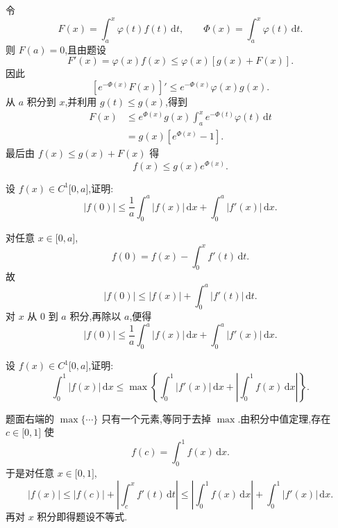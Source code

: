 \begin{solution}
    令
    \[
        F(x)=\int_a^x\varphi(t)f(t)\,\mathrm{d}t,
        \qquad
        \Phi(x)=\int_a^x\varphi(t)\,\mathrm{d}t.
    \]
    则 $F(a)=0$,且由题设
    \[
        F'(x)=\varphi(x)f(x)
        \leq\varphi(x)[g(x)+F(x)].
    \]
    因此
    \[
        [e^{-\Phi(x)}F(x)]'
        \leq e^{-\Phi(x)}\varphi(x)g(x).
    \]
    从 $a$ 积分到 $x$,并利用 $g(t)\leq g(x)$,得到
    \[
        \begin{aligned}
            F(x)
             & \leq e^{\Phi(x)}g(x)
            \int_a^xe^{-\Phi(t)}\varphi(t)\,\mathrm{d}t \\
             & =g(x)[e^{\Phi(x)}-1].
        \end{aligned}
    \]
    最后由 $f(x)\leq g(x)+F(x)$ 得
    \[
        f(x)\leq g(x)e^{\Phi(x)}.
    \]
\end{solution}

\begin{example}
    设 $f(x)\in C^1\lbrack 0,a\rbrack$,证明:
    \[
        |f(0)|\leq\dfrac{1}{a}\int_0^a|f(x)|\,\mathrm{d}x
        +\int_0^a|f'(x)|\,\mathrm{d}x.
    \]
\end{example}
\exampleblank

\begin{solution}
    对任意 $x\in\lbrack0,a\rbrack$,
    \[
        f(0)=f(x)-\int_0^xf'(t)\,\mathrm{d}t.
    \]
    故
    \[
        |f(0)|\leq|f(x)|+\int_0^a|f'(t)|\,\mathrm{d}t.
    \]
    对 $x$ 从 $0$ 到 $a$ 积分,再除以 $a$,便得
    \[
        |f(0)|\leq\dfrac{1}{a}\int_0^a|f(x)|\,\mathrm{d}x
        +\int_0^a|f'(x)|\,\mathrm{d}x.
    \]
\end{solution}

\begin{example}
    设 $f(x)\in C^1\lbrack 0,a\rbrack$,证明:
    \[
        \displaystyle\int_0^1|f(x)|\,\mathrm{d}x
        \leq\max\left\{\int_0^1|f'(x)|\,\mathrm{d}x+
        \left|\int_0^1f(x)\,\mathrm{d}x\right|\right\}.
    \]
\end{example}
\exampleblank

\begin{solution}
    题面右端的 $\max\{\cdots\}$ 只有一个元素,等同于去掉 $\max$.由积分中值定理,存在 $c\in\lbrack0,1\rbrack$ 使
    \[
        f(c)=\int_0^1f(x)\,\mathrm{d}x.
    \]
    于是对任意 $x\in\lbrack0,1\rbrack$,
    \[
        |f(x)|
        \leq|f(c)|+\left|\int_c^xf'(t)\,\mathrm{d}t\right|
        \leq\left|\int_0^1f(x)\,\mathrm{d}x\right|
        +\int_0^1|f'(x)|\,\mathrm{d}x.
    \]
    再对 $x$ 积分即得题设不等式.
\end{solution}



